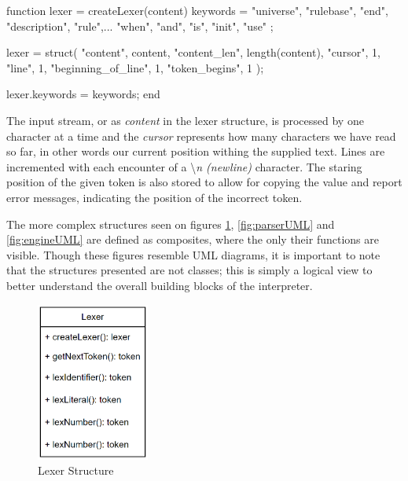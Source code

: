 \begin{octave}
function lexer = createLexer(content)
  keywords = {
    "universe", "rulebase", "end", "description", "rule",...
    "when", "and", "is", "init",  "use"
  };

  lexer = struct(
    "content", content,
    "content_len", length(content),
    "cursor", 1,
    "line", 1,
    "beginning_of_line", 1,
    "token_begins", 1
  );

  lexer.keywords = keywords;
end
\end{octave}

The input stream, or as \textit{content} in the lexer structure, is processed by one character at a time and the \textit{cursor} represents how many characters we have read so far, in other words our current position withing the supplied text. Lines are incremented with each encounter of a \textbackslash\textit{n (newline)} character. The staring position of the given token is also stored to allow for copying the value and report error messages, indicating the position of the incorrect token.

The more complex structures seen on figures \ref{fig:lexerUML}, \ref{fig:parserUML} and \ref{fig:engineUML} are defined as composites, where the only their functions are visible. Though these figures resemble UML diagrams, it is important to note that the structures presented are not classes; this is simply a logical view to better understand the overall building blocks of the interpreter.

\pagebreak

\begin{figure}
\centering
	\includegraphics[width=0.33\textwidth]{images/lexerUML}
	\caption{Lexer Structure}
	\label{fig:lexerUML}
\end{figure}

